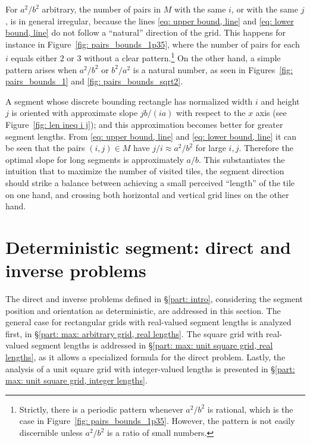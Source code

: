 \documentclass[12pt, a4paper]{article}
\newcommand{\mss}{M}
\begin{document}
For $a^2/b^2$ arbitrary, the number of pairs in $\mss$ with the same $i$, or with the same $j$, is in general irregular, because the lines \eqref{eq: upper bound, line} and \eqref{eq: lower bound, line} do not follow a ``natural'' direction of the grid. This happens for instance in Figure~\ref{fig: pairs_bounds_1p35}, where the number of pairs for each $i$ equals either $2$ or $3$ without a clear pattern.\footnote{Strictly, there is a periodic pattern whenever $a^2/b^2$ is rational, which is the case in Figure~\ref{fig: pairs_bounds_1p35}. However, the pattern is not easily discernible unless $a^2/b^2$ is a ratio of small numbers.}
On the other hand, a simple pattern arises when $a^2/b^2$ or $b^2/a^2$ is a natural number, as seen in Figures~\ref{fig: pairs_bounds_1} and \ref{fig: pairs_bounds_sqrt2}.

A segment whose discrete bounding rectangle has normalized width $i$ and height $j$ is oriented with approximate slope $jb/(ia)$ with respect to the $x$ axis (see Figure~\ref{fig: len ineq i j}); and this approximation becomes better for greater segment lengths. From \eqref{eq: upper bound, line} and \eqref{eq: lower bound, line} it can be seen that the pairs $(i,j) \in \mss$ have $j/i \approx a^2/b^2$ for large $i, j$. Therefore the optimal slope for long segments is approximately $a/b$. This substantiates the intuition that to maximize the number of visited tiles, the segment direction should strike a balance between achieving a small perceived ``length'' of the tile on one hand, and crossing both horizontal and vertical grid lines on the other hand.


\section{Deterministic segment: direct and inverse problems}
\label{part: max}

The direct and inverse problems defined in \S\ref{part: intro}, considering the segment position and orientation as deterministic, are addressed in this section. The general case for rectangular grids with real-valued segment lengths is analyzed first, in \S\ref{part: max: arbitrary grid, real lengths}. The square grid with real-valued segment lengths is addressed in \S\ref{part: max: unit square grid, real lengths}, as it allows a specialized formula for the direct problem. Lastly, the analysis of a unit square grid with integer-valued lengths is presented in \S\ref{part: max: unit square grid, integer lengths}.
\end{document}
